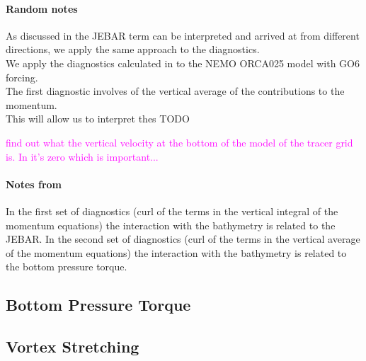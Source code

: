 \documentclass[..\EOYR.tex]{subfiles}
\begin{document}
\paragraph{Random notes} As discussed in  the JEBAR term can be interpreted and arrived at from different directions, we apply the same approach to the diagnostics.\\
We apply the diagnostics calculated in \citep{Bell1999} to the NEMO ORCA025 model with GO6 forcing.\\
The first diagnostic involves  of the vertical average of the contributions to the momentum. \\
This will allow us to interpret thes TODO

    \textcolor{magenta}{find out what the vertical velocity at the bottom of the model of the tracer grid is. In \citep{Bell1999} it's zero which is important...}

\paragraph{Notes from \citep{Bell1999}} In the first set of diagnostics (curl of the terms in the vertical integral of the momentum equations) the interaction with the bathymetry is related to the JEBAR.  In the second set of diagnostics (curl of the terms in the vertical average of the momentum equations) the interaction with the bathymetry is related to the bottom pressure torque.

\subsection{Bottom Pressure Torque}
\subsection{Vortex Stretching}
\end{document}
